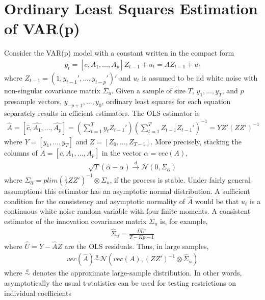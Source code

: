 \section[Ordinary Least Squares Estimation of VAR{(p)}]{Ordinary Least Squares Estimation of VAR{(p)}\label{ex:OrdinaryLeastSquaresEstimationVARp}}
Consider the VAR{(p)} model with a constant written in the compact form
\begin{align*}
y_t = [c, A_1, \ldots, A_p] Z_{t-1} + u_t = A Z_{t-1}+ u_t
\end{align*}
where \(Z_{t-1}=(1,y_{t-1}',\ldots,y_{t-p}')'\)
and \(u_t\) is assumed to be iid white noise with non-singular covariance matrix \(\Sigma_u\).
Given a sample of size \(T\), \(y_1, \ldots, y_T\), and \(p\) presample vectors, \(y_{-p+1},\ldots,y_{0}\),
  ordinary least squares for each equation separately results in efficient estimators.
The OLS estimator is
\begin{align*}
\hat{A} = \left[ \hat{c}, \hat{A_1}, \ldots ,\hat{A_p}\right] = \left(\sum_{t=1}^{T}y_t Z_{t-1}'\right){\left(\sum_{t=1}^{T}Z_{t-1}Z_{t-1}'\right)}^{-1} = Y Z'{(ZZ')}^{-1}
\end{align*}
where \(Y=[y_1, \ldots, y_T]\) and \(Z=[Z_0, \ldots, Z_{T-1}]\).
More precisely, stacking the columns of \(A = [c, A_1,\ldots ,A_p]\) in the vector \(\alpha = vec(A)\),
\begin{align*}
\sqrt{T}\left(\hat{\alpha} - \alpha \right) \overset{d}{\rightarrow} \mathcal{N}(0, \Sigma_{\hat{\alpha}})
\end{align*}
where \(\Sigma_{\hat{\alpha}} = plim(\frac{1}{T}ZZ')^{-1}\otimes \Sigma_u\), if the process is stable.
Under fairly general assumptions this estimator has an asymptotic normal distribution.
A sufficient condition for the consistency and asymptotic normality of \(\hat{A}\) would be
  that \(u_t\) is a continuous white noise random variable with four finite moments.
A consistent estimator of the innovation covariance matrix \(\Sigma_u\) is, for example,
\begin{align*}
\hat{\Sigma}_u = \frac{\hat{U}\hat{U}'}{T-Kp-1}
\end{align*}
where \(\hat{U} = Y - \hat{A}Z\) are the OLS residuals.
Thus, in large samples,
\begin{align*}
vec(\hat{A}) \overset{a}{\sim}\mathcal{N}(vec(A),{(ZZ')}^{-1}\otimes \hat{\Sigma}_u)
\end{align*}
where \(\overset{a}{\sim}\) denotes the approximate large-sample distribution.
In other words, asymptotically the usual t-statistics can be used for testing restrictions on individual coefficients
